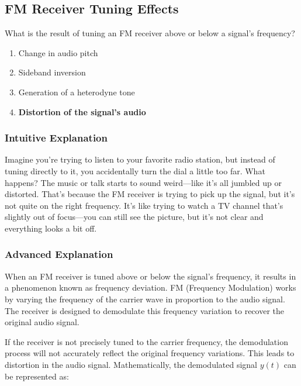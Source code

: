 \subsection{FM Receiver Tuning Effects}
\label{T4B12}

\begin{tcolorbox}[colback=gray!10!white,colframe=black!75!black,title=T4B12]
What is the result of tuning an FM receiver above or below a signal’s frequency?
\begin{enumerate}[label=\Alph*)]
    \item Change in audio pitch
    \item Sideband inversion
    \item Generation of a heterodyne tone
    \item \textbf{Distortion of the signal’s audio}
\end{enumerate}
\end{tcolorbox}

\subsubsection{Intuitive Explanation}
Imagine you’re trying to listen to your favorite radio station, but instead of tuning directly to it, you accidentally turn the dial a little too far. What happens? The music or talk starts to sound weird—like it’s all jumbled up or distorted. That’s because the FM receiver is trying to pick up the signal, but it’s not quite on the right frequency. It’s like trying to watch a TV channel that’s slightly out of focus—you can still see the picture, but it’s not clear and everything looks a bit off.

\subsubsection{Advanced Explanation}
When an FM receiver is tuned above or below the signal’s frequency, it results in a phenomenon known as frequency deviation. FM (Frequency Modulation) works by varying the frequency of the carrier wave in proportion to the audio signal. The receiver is designed to demodulate this frequency variation to recover the original audio signal. 

If the receiver is not precisely tuned to the carrier frequency, the demodulation process will not accurately reflect the original frequency variations. This leads to distortion in the audio signal. Mathematically, the demodulated signal \( y(t) \) can be represented as:

